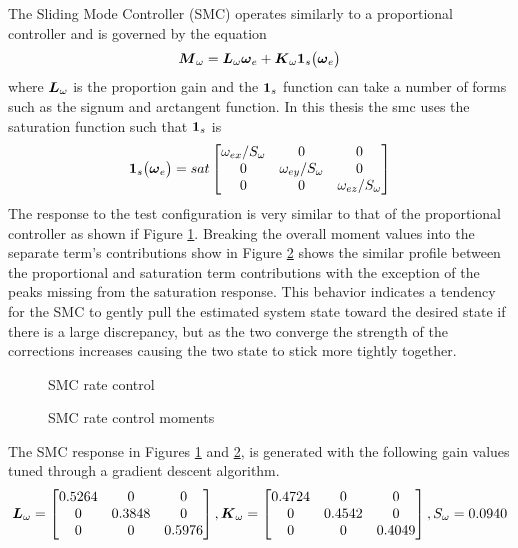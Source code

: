 The Sliding Mode Controller (SMC) operates similarly to a proportional controller and is governed by the equation
\begin{equation}
  \boldsymbol{M}_{\omega} = \boldsymbol{L}_{\omega} \boldsymbol{\omega}_e + \boldsymbol{K}_{\omega}\boldsymbol{1}_s \big(\boldsymbol{\omega}_e \big)
  \label{eqn:SMController}
\end{equation}
where $\boldsymbol{L}_{\omega}$ is the proportion gain and the $\boldsymbol{1}_s$ function can take a number of forms such as the signum and arctangent function.  In this thesis the smc uses the saturation function such that $\boldsymbol{1}_s$ is
\begin{equation}
  \boldsymbol{1}_s \big(\boldsymbol{\omega}_e \big) = sat \begin{bmatrix} \omega_{ex} / S_{\omega} &0 &0 \\ 0 & \omega_{ey} / S_{\omega} & 0 \\ 0 & 0 & \omega_{ez} / S_{\omega} \end{bmatrix}
\end{equation}
The response to the test configuration is very similar to that of the proportional controller as shown if Figure \ref{fig:SMCRateControl}.  Breaking the overall moment values into the separate term's contributions show in Figure \ref{fig:SMCRateControlMoments} shows the similar profile between the proportional and saturation term contributions with the exception of the peaks missing from the saturation response.  This behavior indicates a tendency for the SMC to gently pull the estimated system state toward the desired state if there is a large discrepancy, but as the two converge the strength of the corrections increases causing the two state to stick more tightly together.
\begin{figure}[H]
  \centerline{}
  \caption{SMC rate control}
  \label{fig:SMCRateControl}
\end{figure}
\begin{figure}[H]
  \centerline{}
  \caption{SMC rate control moments}
  \label{fig:SMCRateControlMoments}
\end{figure}
The SMC response in Figures \ref{fig:SMCRateControl} and \ref{fig:SMCRateControlMoments}, is generated with the following gain values tuned through a gradient descent algorithm.
\begin{equation}
    \boldsymbol{L}_{\omega} = \begin{bmatrix} 0.5264 & 0 & 0 \\ 0 & 0.3848 & 0 \\ 0 & 0 & 0.5976 \end{bmatrix},
    \boldsymbol{K}_{\omega} = \begin{bmatrix} 0.4724 & 0 & 0 \\ 0 & 0.4542 & 0 \\ 0 & 0 & 0.4049 \end{bmatrix},
    S_{\omega} = 0.0940
  \label{SMCRateControlGains}
\end{equation}

